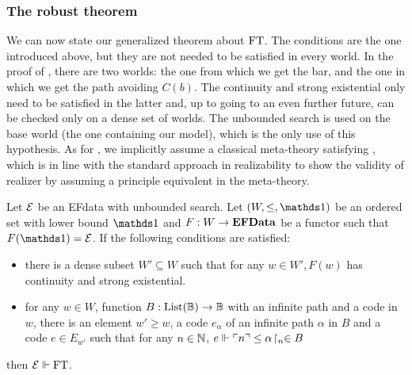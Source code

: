 \documentclass[a4paper,UKenglish,cleveref, autoref, thm-restate]{lipics-v2021}
\begin{document}
\subsubsection{The robust theorem}
We can now state our generalized theorem about $\mathrm{FT}$. The conditions are the one introduced above, but they are not needed to be satisfied in every world. In the proof of , there are two worlds: the one from which we get the bar, and the one in which we get the path avoiding $C(b)$. The continuity and strong existential only need to be satisfied in the latter and, up to going to an even further future, can be checked only on a dense set of worlds. The unbounded search is used on the base world (the one containing our model), which is the only use of this hypothesis.
As for ,
we implicitly assume a classical meta-theory satisfying \WKL,
which is in line with the standard approach in realizability to show the validity
of realizer by assuming a principle equivalent in the meta-theory.
\begin{theorem}\label{thm:main}
  Let $\mathcal{E}$ be an EFdata with unbounded search. Let $(W,\leq,\bOne)$ be an ordered set with lower bound $\bOne$ and $F : W \to \mathbf{EFData}$ be a functor such that $F(\bOne) = \EFE$. If the following conditions are satisfied:
  \begin{itemize}
  \item there is a dense subset $W' \subseteq W$ such that for any $w \in W', F(w)$ has continuity and strong existential.
  \item for any $w \in W$, function $B : \mathrm{List}(\mathbb B) \to \mathbb B$ with an infinite path
  and a code in $w$, there is an element $w' \geq w$,
  a code $e_\alpha$ of an infinite path $\alpha$ in $B$
  and a code $e \in E_{w'}$ such that for any $n \in \mathbb N$,
  $e \Vdash \ulcorner n\urcorner \leq {\alpha}\!\upharpoonright_{n} \in B$
  \end{itemize}
  then $\mathcal{E} \Vdash \mathrm{FT}$.
\end{theorem}
\end{document}
